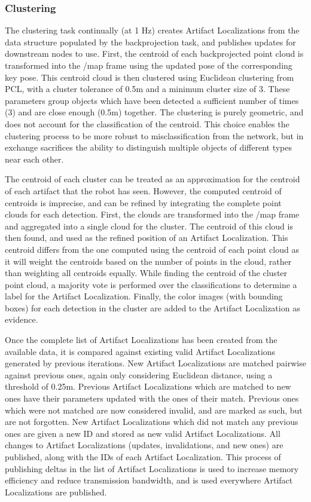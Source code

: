 \subsubsection{Clustering}
The clustering task continually (at 1 Hz) creates Artifact Localizations from the data structure populated by the backprojection task, and publishes updates for downstream nodes to use. First, the centroid of each backprojected point cloud is transformed into the /map frame using the updated pose of the corresponding key pose. This centroid cloud is then clustered using Euclidean clustering from PCL, with a cluster tolerance of 0.5m and a minimum cluster size of 3. These parameters group objects which have been detected a sufficient number of times (3) and are close enough (0.5m) together. The clustering is purely geometric, and does not account for the classification of the centroid. This choice enables the clustering process to be more robust to misclassification from the network, but in exchange sacrifices the ability to distinguish multiple objects of different types near each other.
	
The centroid of each cluster can be treated as an approximation for the centroid of each artifact that the robot has seen. However, the computed centroid of centroids is imprecise, and can be refined by integrating the complete point clouds for each detection. First, the clouds are transformed into the /map frame and aggregated into a single cloud for the cluster. The centroid of this cloud is then found, and used as the refined position of an Artifact Localization. This centroid differs from the one computed using the centroid of each point cloud as it will weight the centroids based on the number of points in the cloud, rather than weighting all centroids equally. While finding the centroid of the cluster point cloud, a majority vote is performed over the classifications to determine a label for the Artifact Localization. Finally, the color images (with bounding boxes) for each detection in the cluster are added to the Artifact Localization as evidence.
	
Once the complete list of Artifact Localizations has been created from the available data, it is compared against existing valid Artifact Localizations generated by previous iterations. New Artifact Localizations are matched pairwise against previous ones, again only considering Euclidean distance, using a threshold of 0.25m. Previous Artifact Localizations which are matched to new ones have their parameters updated with the ones of their match. Previous ones which were not matched are now considered invalid, and are marked as such, but are not forgotten. New Artifact Localizations which did not match any previous ones are given a new ID and stored as new valid Artifact Localizations. All changes to Artifact Localizations (updates, invalidations, and new ones) are published, along with the IDs of each Artifact Localization. This process of publishing deltas in the list of Artifact Localizations is used to increase memory efficiency and reduce transmission bandwidth, and is used everywhere Artifact Localizations are published.
	
